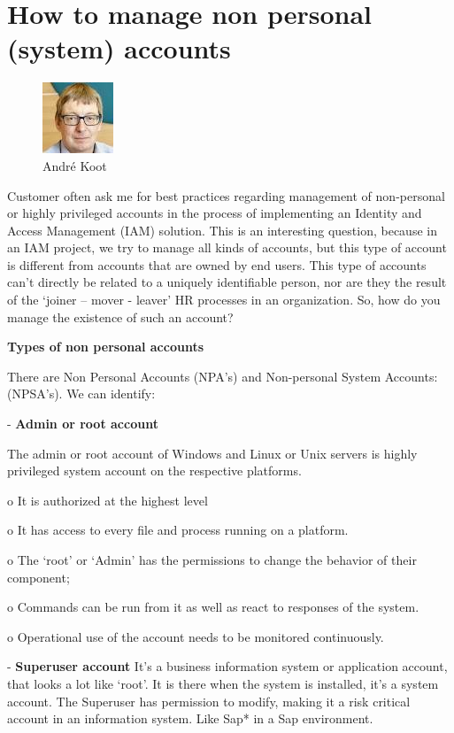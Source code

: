 \hypertarget{how-to-manage-non-personal-system-accounts}{%
\section{How to manage non personal (system)
accounts}\label{how-to-manage-non-personal-system-accounts}}

\begin{figure}
\centering
\includegraphics{./10_accounts/10_non_personal_accounts/b4974b37d04e9c5e7e898d82c65a9566fdf029fe.jpg}
\caption{André Koot}
\end{figure}

Customer often ask me for best practices regarding management of
non-personal or highly privileged accounts in the process of
implementing an Identity and Access Management (IAM) solution. This is
an interesting question, because in an IAM project, we try to manage all
kinds of accounts, but this type of account is different from accounts
that are owned by end users. This type of accounts can't directly be
related to a uniquely identifiable person, nor are they the result of
the `joiner -- mover - leaver' HR processes in an organization. So, how
do you manage the existence of such an account?

\textbf{Types of non personal accounts}

There are Non Personal Accounts (NPA's) and Non-personal System
Accounts: (NPSA's). We can identify:

- \textbf{Admin or root account}

The admin or root account of Windows and Linux or Unix servers is highly
privileged system account on the respective platforms.

o It is authorized at the highest level

o It has access to every file and process running on a platform.

o The `root' or `Admin' has the permissions to change the behavior of
their component;

o Commands can be run from it as well as react to responses of the
system.

o Operational use of the account needs to be monitored continuously.

- \textbf{Superuser account} It's a business information system or
application account, that looks a lot like `root'. It is there when the
system is installed, it's a system account. The Superuser has permission
to modify, making it a risk critical account in an information system.
Like Sap* in a Sap environment.

